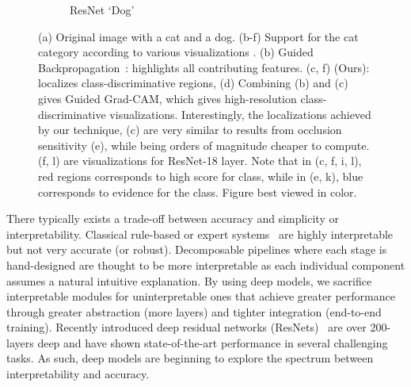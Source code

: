 \begin{figure}[t!]
\begin{subfigure}[t]{0.161\textwidth}
		\caption{\hspace{-1.9pt}\scriptsize{ResNet \gcam{} `Dog'}}
        \label{fig:teaser_gcam_resnet}
	\end{subfigure}
    \vspace{14pt}
	\caption{
		(a) Original image with a cat and a dog. (b-f) Support for the cat category according to various visualizations .
		(b) Guided Backpropagation~\cite{springenberg_arxiv14}: highlights all contributing features. (c, f) \gcam{} (Ours): localizes class-discriminative regions, (d) Combining (b) and (c) gives Guided Grad-CAM, which gives high-resolution class-discriminative visualizations. %
		Interestingly, the localizations achieved by our \gcam{} technique, (c) are very similar to results from occlusion sensitivity (e), while being orders of magnitude cheaper to compute. (f, l) are \gcam{} visualizations for ResNet-18 layer.
		Note that in (c, f, i, l), red regions corresponds to high score for class, while in (e, k), blue corresponds to evidence for the class.
		Figure best viewed in color.
	  }
    \label{fig:teaser}
\end{figure}

There typically exists a trade-off between accuracy and simplicity or interpretability.
Classical rule-based or expert systems~\cite{jackson_expertsys} are highly interpretable but not very accurate (or robust).
Decomposable pipelines where each stage is hand-designed are thought to be more interpretable as each individual component assumes a natural intuitive explanation.
By using deep models, we sacrifice interpretable modules for uninterpretable ones that achieve greater performance through greater abstraction (more layers) and tighter integration (end-to-end training). Recently introduced deep residual networks (ResNets)~\cite{he_cvpr15} are over 200-layers deep and have shown state-of-the-art performance in several challenging tasks. 
As such, deep models are beginning to explore the spectrum between interpretability and accuracy.







